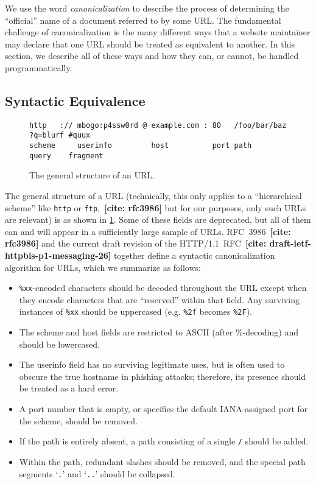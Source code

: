 \documentclass[oneside]{zarticle}
\def\todo#1{{\color{todocolor}\bfseries [#1]}}
\def\needcite#1{\todo{cite: #1}}
\begin{document}
We use the word \emph{canonicalization} to describe the process of
determining the “official” name of a document referred to by some URL.
The fundamental challenge of canonicalization is the many different
ways that a website maintainer may declare that one URL should be
treated as equivalent to another.  In this section, we describe all of
these ways and how they can, or cannot, be handled programmatically.

\subsection{Syntactic Equivalence}

\begin{figure}
\begin{verbatim}
http   :// mbogo:p4ssw0rd @ example.com : 80   /foo/bar/baz ?q=blurf #quux
scheme     userinfo         host          port path         query    fragment
\end{verbatim}
\caption{The general structure of an URL.}\label{fig:url-structure}
\end{figure}

The general structure of a URL (technically, this only applies to a
“hierarchical scheme” like \verb|http| or
\verb|ftp|,~\needcite{rfc3986} but for our
purposes, only such URLs are relevant) is as shown in
\ref{fig:url-structure}.  Some of these fields are deprecated, but all
of them can and will appear in a sufficiently large sample of URLs.
RFC~3986~\needcite{rfc3986} and the current draft revision of the
HTTP/1.1~RFC~\needcite{draft-ietf-httpbis-p1-messaging-26} together
define a syntactic canonicalization algorithm for URLs, which we
summarize as follows:

\begin{itemize}
\item \verb|%xx|-encoded characters should be decoded throughout the
      URL except when they encode characters that are “reserved”
      within that field.  Any surviving instances of \verb|%xx|
      should be uppercased (e.g. \verb|%2f| becomes \verb|%2F|).
\item The scheme and host fields are restricted to ASCII (after
      \%-decoding) and should be lowercased.
\item The userinfo field has no surviving legitimate uses, but is
      often used to obscure the true hostname in phishing attacks;
      therefore, its presence should be treated as a hard error.
\item A port number that is empty, or specifies the default
      IANA-assigned port for the scheme, should be removed.
\item If the path is entirely absent, a path consisting of a single
      \verb|/| should be added.
\item Within the path, redundant slashes should be removed, and
      the special path segments `\verb|.|' and `\verb|..|' should
      be collapsed.
\end{itemize}
\end{document}
